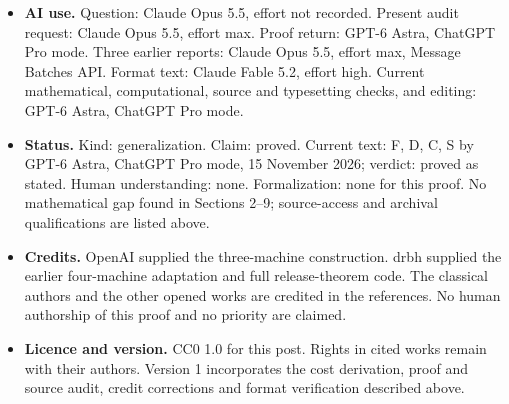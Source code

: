 \begin{itemize}[leftmargin=*,itemsep=3pt]
\item \textbf{AI use.} Question: Claude Opus 5.5, effort not recorded. Present audit request: Claude Opus 5.5, effort max. Proof return: GPT-6 Astra, ChatGPT Pro mode. Three earlier reports: Claude Opus 5.5, effort max, Message Batches API. Format text: Claude Fable 5.2, effort high. Current mathematical, computational, source and typesetting checks, and editing: GPT-6 Astra, ChatGPT Pro mode.
\item \textbf{Status.} Kind: generalization. Claim: proved. Current text: F, D, C, S by GPT-6 Astra, ChatGPT Pro mode, 15 November 2026; verdict: proved as stated. Human understanding: none. Formalization: none for this proof. No mathematical gap found in Sections 2--9; source-access and archival qualifications are listed above.
\item \textbf{Credits.} OpenAI \cite[Sections 2--9]{P} supplied the three-machine construction. drbh \cite[commit \texttt{bbd3013}]{D} supplied the earlier four-machine adaptation and full release-theorem code. The classical authors and the other opened works are credited in the references. No human authorship of this proof and no priority are claimed.
\item \textbf{Licence and version.} CC0 1.0 for this post. Rights in cited works remain with their authors. Version 1 incorporates the cost derivation, proof and source audit, credit corrections and format verification described above.
\end{itemize}




